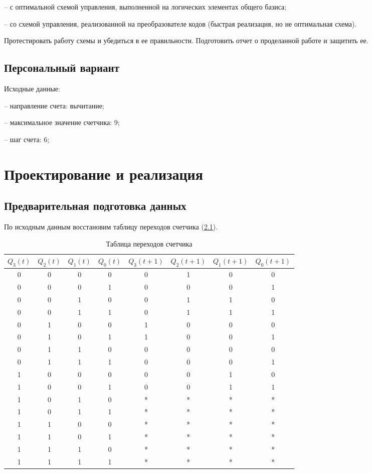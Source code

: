 \documentclass[14pt, a4paper]{extreport}
\begin{document}
-- с оптимальной схемой управления, выполненной на логических элементах общего базиса;

-- со схемой управления, реализованной на преобразователе кодов (быстрая реализация, но не оптимальная схема).

Протестировать работу схемы и убедиться в ее правильности. Подготовить отчет о проделанной работе и защитить ее.

\section{Персональный вариант}
Исходные данные:

-- направление счета: вычитание;

-- максимальное значение счетчика: 9;

-- шаг счета: 6;

\chapter{Проектирование и реализация}
\section{Предварительная подготовка данных}
По исходным данным восстановим таблицу переходов счетчика (\cref{tab:states}).

\begin{table}[H]
	\caption{Таблица переходов счетчика}
	\label{tab:states}
	\begin{tabular}{|c|c|c|c|c|c|c|c|}
		\hline
		$Q_3(t)$ & $Q_2(t)$ & $Q_1(t)$ & $Q_0(t)$ & $Q_3(t + 1)$ & $Q_2(t + 1)$ & $Q_1(t + 1)$ & $Q_0(t + 1)$ \\
		\hline
		0 & 0 & 0 & 0 & 0 & 1 & 0 & 0 \\
		\hline
		0 & 0 & 0 & 1 & 0 & 0 & 0 & 1 \\
		\hline
		0 & 0 & 1 & 0 & 0 & 1 & 1 & 0 \\
		\hline
		0 & 0 & 1 & 1 & 0 & 1 & 1 & 1 \\
		\hline
		0 & 1 & 0 & 0 & 1 & 0 & 0 & 0 \\
		\hline
		0 & 1 & 0 & 1 & 1 & 0 & 0 & 1 \\
		\hline
		0 & 1 & 1 & 0 & 0 & 0 & 0 & 0 \\
		\hline
		0 & 1 & 1 & 1 & 0 & 0 & 0 & 1 \\
		\hline
		1 & 0 & 0 & 0 & 0 & 0 & 1 & 0 \\
		\hline
		1 & 0 & 0 & 1 & 0 & 0 & 1 & 1 \\
		\hline
		1 & 0 & 1 & 0 & * & * & * & * \\
		\hline
		1 & 0 & 1 & 1 & * & * & * & * \\
		\hline
		1 & 1 & 0 & 0 & * & * & * & * \\
		\hline
		1 & 1 & 0 & 1 & * & * & * & * \\
		\hline
		1 & 1 & 1 & 0 & * & * & * & * \\
		\hline
		1 & 1 & 1 & 1 & * & * & * & * \\
		\hline
	\end{tabular}
\end{table}
\end{document}
